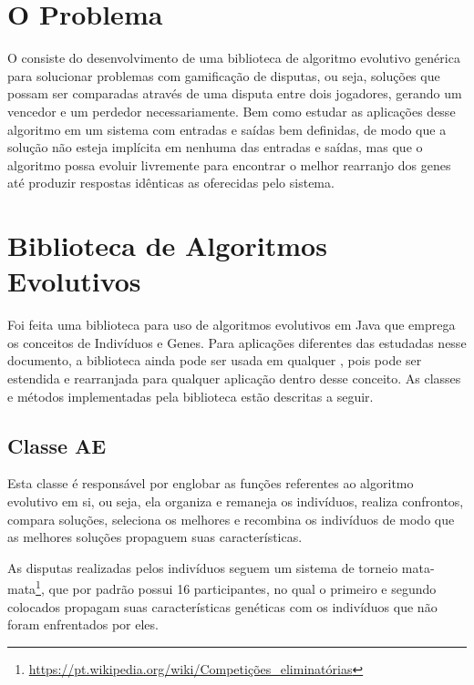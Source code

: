 \section{O Problema}

O consiste do desenvolvimento de uma biblioteca de algoritmo evolutivo genérica para solucionar problemas com gamificação de disputas, ou seja, soluções que possam ser comparadas através de uma disputa entre dois jogadores, gerando um vencedor e um perdedor necessariamente. Bem como estudar as aplicações desse algoritmo em um sistema com entradas e saídas bem definidas, de modo que a solução não esteja implícita em nenhuma das entradas e saídas, mas que o algoritmo possa evoluir livremente para encontrar o melhor rearranjo dos genes até produzir respostas idênticas as oferecidas pelo sistema.

\section{Biblioteca de Algoritmos Evolutivos}

Foi feita uma biblioteca para uso de algoritmos evolutivos em Java que emprega os conceitos de Indivíduos e Genes. Para aplicações diferentes das estudadas nesse documento, a biblioteca ainda pode ser usada em qualquer \SE, pois pode ser estendida e rearranjada para qualquer aplicação dentro desse conceito. As classes e métodos implementadas pela biblioteca estão descritas a seguir.

\subsection{Classe AE}

Esta classe é responsável por englobar as funções referentes ao algoritmo evolutivo em si, ou seja, ela organiza e remaneja os indivíduos, realiza confrontos, compara soluções, seleciona os melhores e recombina os indivíduos de modo que as melhores soluções propaguem suas características.

As disputas realizadas pelos indivíduos seguem um sistema de torneio mata-mata\footnote{\url{https://pt.wikipedia.org/wiki/Competições_eliminatórias}}, que por padrão possui 16 participantes, no qual o primeiro e segundo colocados propagam suas características genéticas com os indivíduos que não foram enfrentados por eles.

